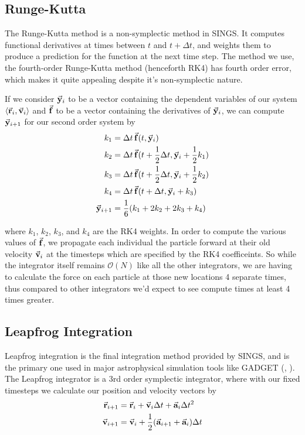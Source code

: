 \documentclass[12pt, twoside, letterpaper]{article}
\begin{document}
\subsection{Runge-Kutta} \label{subsec:rk4}
The Runge-Kutta method is a non-symplectic method in SINGS. It computes functional derivatives at times between $t$ and $t + \Delta t$, and weights them to produce a prediction for the function at the next time step. The method we use, the fourth-order Runge-Kutta method (henceforth RK4) has fourth order error, which makes it quite appealing despite it's non-symplectic nature.

If we consider $\va{y}_i$ to be a vector containing the dependent variables of our system $\langle \va{r}_i, \va{v}_i \rangle$ and $\va{f}$ to be a vector containing the derivatives of $\va{y}_i$, we can compute $\va{y}_{i+1}$ for our second order system by 
\begin{subequations} \label{eq:rk4}
	\begin{align}
		k_1 & = \Delta t \, \va{f}(t, \va{y}_i)\\
		k_2 & = \Delta t \, \va{f}(t + \frac{1}{2} \Delta t, \va{y}_i + \frac{1}{2} k_1) \\
		k_3 & = \Delta t \, \va{f}(t + \frac{1}{2} \Delta t, \va{y}_i + \frac{1}{2} k_2) \\
		k_4 & = \Delta t \, \va{f}(t + \Delta t, \va{y}_i + k_3) \\
		\va{y}_{i+1} & = \frac{1}{6}(k_1 + 2k_2 + 2k_3 + k_4)
	\end{align}
\end{subequations}

\noindent where $k_1$, $k_2$, $k_3$, and $k_4$ are the RK4 weights. In order to compute the various values of $\va{f}$, we propagate each individual the particle forward at their old velocity $\va{v}_i$ at the timesteps which are specified by the RK4 coefficeints. So while the integrator itself remains $\mathcal{O}(N)$ like all the other integrators, we are having to calculate the force on each particle at those new locations 4 separate times, thus compared to other integrators we'd expect to see compute times at least 4 times greater.

\subsection{Leapfrog Integration} \label{subsec:leapfrog}
Leapfrog integration is the final integration method provided by SINGS, and is the primary one used in major astrophysical simulation tools like GADGET (\citet{springel2005simulating}, \citet{springel2021simulating}). The Leapfrog integrator is a 3rd order symplectic integrator, where with our fixed timesteps we calculate our position and velocity vectors by
\begin{subequations} \label{eq:leapfrog}
	\begin{align}
		\va{r}_{i+1} & = \va{r}_i + \va{v}_i \Delta t + \va{a}_i \Delta t^2 \\
		\va{v}_{i+1} & = \va{v}_i + \frac{1}{2}(\va{a}_{i+1} + \va{a}_i) \Delta t
	\end{align}		
\end{subequations}
\end{document}
